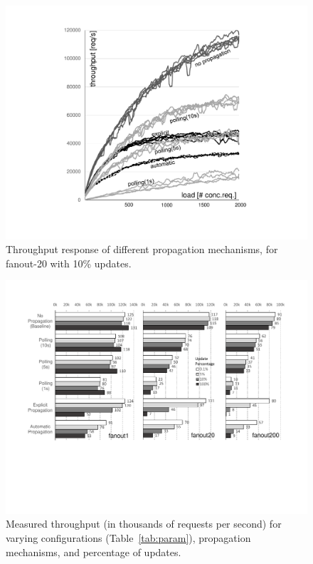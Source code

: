 \begin{figure}
\noindent
\centering
\includegraphics[width=\columnwidth, viewport=154 86 630 553]{figs/tp-curves} 
\caption{Throughput response of different propagation mechanisms, for fanout-20 with 10\% updates.}\label{fig:tp-curves}
\end{figure}
\begin{figure}
\noindent
\centering
\includegraphics[width=\textwidth, viewport=58 195 726 550]{figs/tp-all} 
\caption{Measured throughput (in thousands of requests per second) for varying configurations (Table~\ref{tab:param}), propagation mechanisms, and percentage of updates.}\label{fig:tp-all}
\end{figure}


